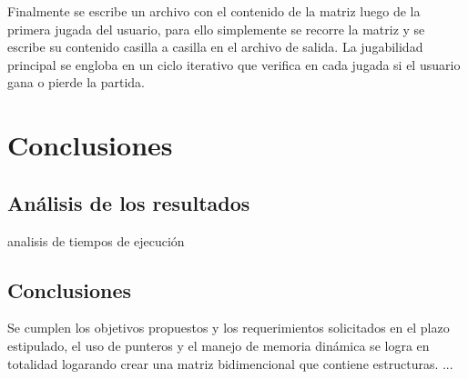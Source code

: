 \documentclass[letterpaper,12pt]{report}
\begin{document}
Finalmente se escribe un archivo con el contenido de la matriz luego de la primera jugada del usuario, para ello simplemente se recorre la matriz y se escribe su contenido casilla a casilla en el archivo de salida. La jugabilidad principal se engloba en un ciclo iterativo que verifica en cada jugada si el usuario gana o pierde la partida.


\chapter{Conclusiones}

\section {An\'alisis de los resultados}

analisis de tiempos de ejecución

\section {Conclusiones}

Se cumplen los objetivos propuestos y los requerimientos solicitados en el plazo estipulado, el uso de punteros y el manejo de memoria dinámica se logra en totalidad logarando crear una matriz bidimencional que contiene estructuras. ...
\end{document}
